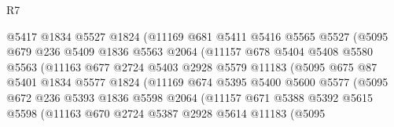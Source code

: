 \begin{lexlean}{R7}
\begin{coremodule}
                          @5417
                          @1834
                          @5527
                          @1824
                          (@11169
                            @681
                            @5411
                            @5416
                            @5565
                            @5527
                            (@5095
                              @679
                              @236
                              @5409
                              @1836
                              @5563
                              @2064
                              (@11157
                                @678
                                @5404
                                @5408
                                @5580
                                @5563
                                (@11163
                                  @677
                                  @2724
                                  @5403
                                  @2928
                                  @5579
                                  @11183
                                  (@5095
                                    @675
                                    @87
                                    @5401
                                    @1834
                                    @5577
                                    @1824
                                    (@11169
                                      @674
                                      @5395
                                      @5400
                                      @5600
                                      @5577
                                      (@5095
                                        @672
                                        @236
                                        @5393
                                        @1836
                                        @5598
                                        @2064
                                        (@11157
                                          @671
                                          @5388
                                          @5392
                                          @5615
                                          @5598
                                          (@11163
                                            @670
                                            @2724
                                            @5387
                                            @2928
                                            @5614
                                            @11183
                                            (@5095

\end{coremodule}
\end{lexlean}
